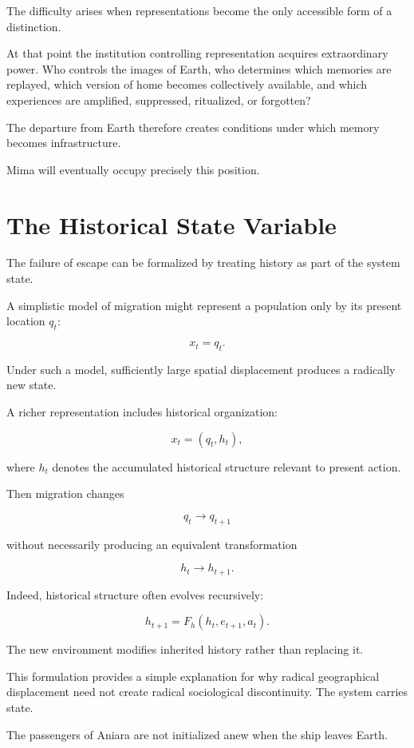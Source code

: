 \documentclass[11pt,oneside]{book}
\theoremstyle{definition}
\theoremstyle{remark}
\begin{document}
The difficulty arises when representations become the only accessible form of a distinction.

At that point the institution controlling representation acquires extraordinary power. Who controls the images of Earth, who determines which memories are replayed, which version of home becomes collectively available, and which experiences are amplified, suppressed, ritualized, or forgotten?

The departure from Earth therefore creates conditions under which memory becomes infrastructure.

Mima will eventually occupy precisely this position.

\section{The Historical State Variable}

The failure of escape can be formalized by treating history as part of the system state.

A simplistic model of migration might represent a population only by its present location \(q_t\):

\[
x_t=q_t.
\]

Under such a model, sufficiently large spatial displacement produces a radically new state.

A richer representation includes historical organization:

\[
x_t
=
(q_t,h_t),
\]

where \(h_t\) denotes the accumulated historical structure relevant to present action.

Then migration changes

\[
q_t\rightarrow q_{t+1}
\]

without necessarily producing an equivalent transformation

\[
h_t\rightarrow h_{t+1}.
\]

Indeed, historical structure often evolves recursively:

\[
h_{t+1}
=
F_h(h_t,e_{t+1},a_t).
\]

The new environment modifies inherited history rather than replacing it.

This formulation provides a simple explanation for why radical geographical displacement need not create radical sociological discontinuity. The system carries state.

The passengers of Aniara are not initialized anew when the ship leaves Earth.
\end{document}
